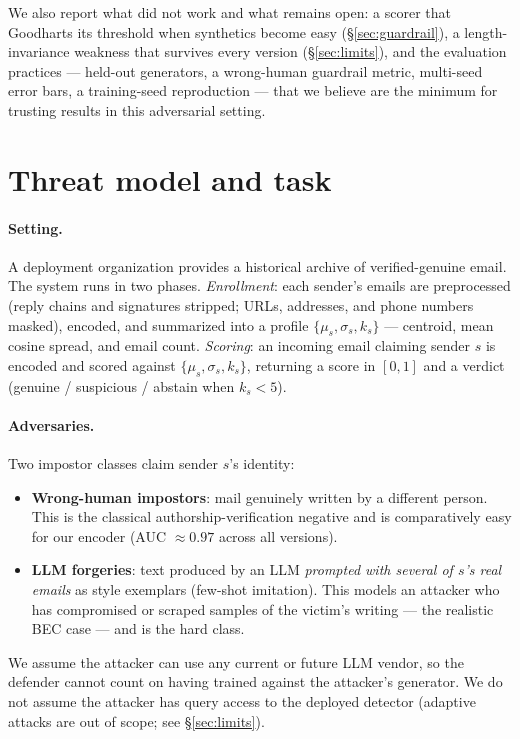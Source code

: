 \documentclass[11pt]{article}
\begin{document}
We also report what did not work and what remains open: a scorer that Goodharts its
threshold when synthetics become easy (\S\ref{sec:guardrail}), a length-invariance weakness that
survives every version (\S\ref{sec:limits}), and the evaluation practices --- held-out generators,
a wrong-human guardrail metric, multi-seed error bars, a training-seed reproduction ---
that we believe are the minimum for trusting results in this adversarial setting.

\section{Threat model and task}
\label{sec:threat}

\paragraph{Setting.} A deployment organization provides a historical archive of verified-genuine
email. The system runs in two phases. \emph{Enrollment}: each sender's emails are preprocessed
(reply chains and signatures stripped; URLs, addresses, and phone numbers masked), encoded, and
summarized into a profile $\{\mu_s, \sigma_s, k_s\}$ --- centroid, mean cosine spread, and email
count. \emph{Scoring}: an incoming email claiming sender $s$ is encoded and scored against
$\{\mu_s, \sigma_s, k_s\}$, returning a score in $[0,1]$ and a verdict (genuine / suspicious /
abstain when $k_s < 5$).

\paragraph{Adversaries.} Two impostor classes claim sender $s$'s identity:
\begin{itemize}[leftmargin=2em]
\item \textbf{Wrong-human impostors}: mail genuinely written by a different person. This is the
      classical authorship-verification negative and is comparatively easy for our encoder
      (AUC ${\approx}0.97$ across all versions).
\item \textbf{LLM forgeries}: text produced by an LLM \emph{prompted with several of $s$'s real
      emails} as style exemplars (few-shot imitation). This models an attacker who has compromised
      or scraped samples of the victim's writing --- the realistic BEC case --- and is the hard class.
\end{itemize}
We assume the attacker can use any current or future LLM vendor, so the defender cannot count
on having trained against the attacker's generator. We do not assume the attacker has query access
to the deployed detector (adaptive attacks are out of scope; see \S\ref{sec:limits}).
\end{document}

